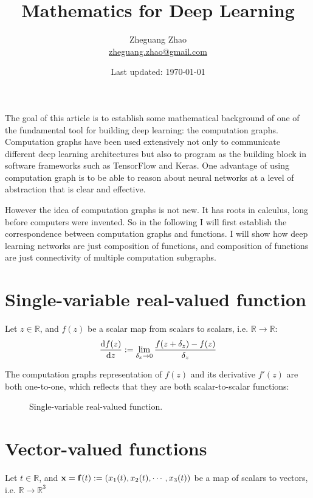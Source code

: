 \documentclass[11pt]{article}
\newcommand{\numset}[1]{\mathbb{#1}}
\newcommand{\goto}{\rightarrow}
\begin{document}
\title{Mathematics for Deep Learning}
\author{Zheguang Zhao \\  \href{mailto:zheguang.zhao@gmail.com}{zheguang.zhao@gmail.com}}
\date{Last updated: \today}
\maketitle

The goal of this article is to establish some mathematical background of one of the fundamental tool for building deep learning: the computation graphs.  Computation graphs have been used extensively not only to communicate different deep learning architectures but also to program as the building block in software frameworks such as TensorFlow and Keras.  One advantage of using computation graph is to be able to reason about neural networks at a level of abstraction that is clear and effective.  

However the idea of computation graphs is not new.  It has roots in calculus, long before computers were invented.  So in the following I will first establish the correspondence between computation graphs and functions.  I will show how deep learning networks are just composition of functions, and composition of functions are just connectivity of multiple computation subgraphs.


\section{Single-variable real-valued function}
Let $z \in \numset{R}$, and $f(z)$ be a scalar map from scalars to scalars, i.e. $\numset{R} \rightarrow \numset{R}$:
\begin{align}
	\dv{f(z)}{z} := \lim_{\delta_x \goto 0} \frac{f(z + \delta_z) - f(z)}{\delta_z}
\end{align}

The computation graphs representation of $f(z)$ and its derivative $f'(z)$ are both one-to-one, which reflects that they are both scalar-to-scalar functions:
\begin{figure}[h]
	\centering
		\centering
		\caption{$f(z)$}
	\caption{Single-variable real-valued function.}
\end{figure}

\section{Vector-valued functions}
Let $t \in \numset{R}$, and $\vb{x} = \vb{f}(t) := \qty(x_1(t), x_2(t), \cdots, x_3(t))$ be a  map of scalars to vectors, i.e. $\numset{R} \rightarrow \numset{R}^3$ 
\end{document}
